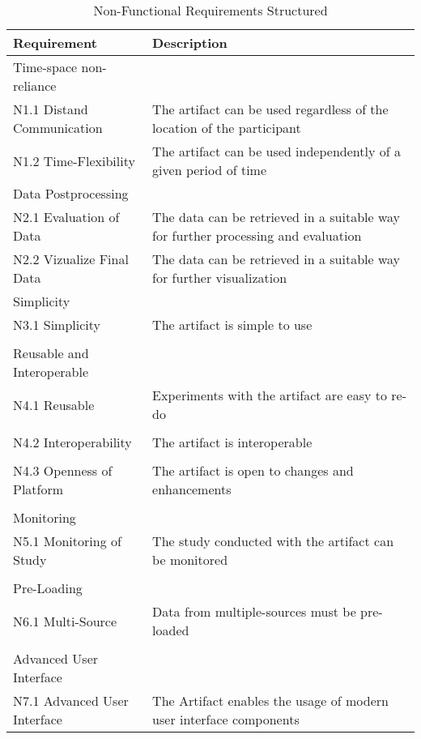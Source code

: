 \begin{table}
    \centering
    \small
    \begin{tabular}{L{0.35\textwidth}L{0.59\textwidth}}
    \hline
Requirement                             & Description \\ \hline
    Time-space non-reliance     &             \\ \hline
    N1.1 Distand Communication      & The artifact can be used regardless of the location of the participant            \\
    N1.2 Time-Flexibility           & The artifact can be used independently of a given period of time            \\ \hline
    Data Postprocessing &             \\ \hline
    N2.1 Evaluation of Data         & The data can be retrieved in a suitable way for further processing and evaluation            \\
    N2.2 Vizualize Final Data       & The data can be retrieved in a suitable way for further visualization             \\ \hline
    Simplicity                  &            \\ \hline
    N3.1 Simplicity                 & The artifact is simple to use           \\
    & \\ \hline
    Reusable and Interoperable  &             \\ \hline
    N4.1 Reusable                   & Experiments with the artifact are easy to re-do           \\
    & \\
    N4.2 Interoperability           & The artifact is interoperable            \\
    & \\
    N4.3 Openness of Platform       & The artifact is open to changes and enhancements \\
    & \\ \hline
    Monitoring                  &             \\ \hline
    N5.1 Monitoring of Study        & The study conducted with the artifact can be monitored            \\ 
    & \\ \hline
    Pre-Loading                 &             \\ \hline
    N6.1 Multi-Source             & Data from multiple-sources must be pre-loaded            \\ 
    & \\ \hline
    Advanced User Interface   &             \\ \hline
    N7.1 Advanced User Interface  & The Artifact enables the usage of modern user interface components            \\ \hline
    \end{tabular}
    \caption[Non-Functional Requirements Structured]{Non-Functional Requirements Structured}\label{tab:NonFuncRequirementsCat}
    \end{table}
